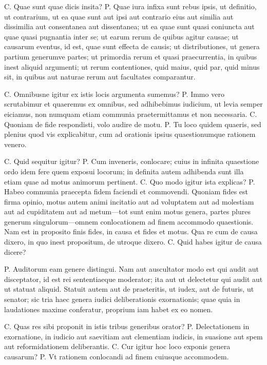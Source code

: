  C. Quae sunt quae dicis insita? P. Quae iura infixa sunt rebus ipsis, ut definitio, ut contrarium, ut ea quae sunt aut ipsi aut contrario eius aut similia aut dissimilia aut consentanea aut dissentanea; ut ea quae sunt quasi coniuncta aut quae quasi pugnantia inter se; ut earum rerum de quibus agitur causae; ut causarum eventus, id est, quae sunt effecta de causis; ut distributiones, ut genera partium generumve partes; ut primordia rerum et quasi praecurrentia, in quibus inest aliquid argumenti; ut rerum contentiones, quid maius, quid par, quid minus sit, in quibus aut naturae rerum aut facultates comparantur.

 C. Omnibusne igitur ex istis locis argumenta sumemus? P. Immo vero scrutabimur et quaeremus ex omnibus, sed adhibebimus iudicium, ut levia semper eiciamus, non numquam etiam communia praetermittamus et non necessaria. C. Quoniam de fide respondisti, volo audire de motu. P. Tu loco quidem quaeris, sed plenius quod vis explicabitur, cum ad orationis ipsius quaestionumque rationem venero.

 C. Quid sequitur igitur? P. Cum inveneris, conlocare; cuius in infinita quaestione ordo idem fere quem exposui locorum; in definita autem adhibenda sunt illa etiam quae ad motus animorum pertinent. C. Quo modo igitur ista explicas? P. Habeo communia praecepta fidem faciendi et commovendi. Quoniam fides est firma opinio, motus autem animi incitatio aut ad voluptatem aut ad molestiam aut ad cupiditatem aut ad metum—tot sunt enim motus genera, partes plures generum singulorum—omnem conlocationem ad finem accommodo quaestionis. Nam est in proposito finis fides, in causa et fides et motus. Qua re cum de causa dixero, in quo inest propositum, de utroque dixero. C. Quid habes igitur de causa dicere?

 P. Auditorum eam genere distingui. Nam aut auscultator modo est qui audit aut disceptator, id est rei sententiaeque moderator; ita aut ut delectetur qui audit aut ut statuat aliquid. Statuit autem aut de praeteritis, ut iudex, aut de futuris, ut senator; sic tria haec genera iudici deliberationis exornationis; quae quia in laudationes maxime conferatur, proprium iam habet ex eo nomen.

 C. Quas res sibi proponit in istis tribus generibus orator? P. Delectationem in exornatione, in iudicio aut saevitiam aut clementiam iudicis, in suasione aut spem aut reformidationem deliberantis. C. Cur igitur hoc loco exponis genera causarum? P. Vt rationem conlocandi ad finem cuiusque accommodem.

